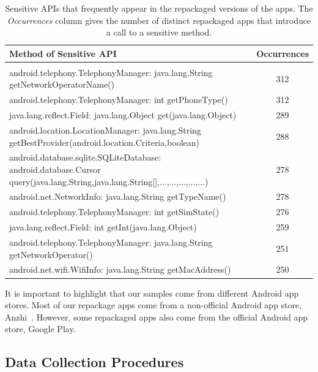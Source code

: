 \begin{table}[ht]
  \caption{Sensitive APIs that frequently appear in the repackaged versions of the apps. The
    \emph{Occurrences} column gives the number of distinct repackaged apps that introduce a call
  to a sensitive method.}
\centering
  \begin{tabular}{lc}

    \hline
    Method of Sensitive API & Occurrences \\
    \hline \\
    android.telephony.TelephonyManager: java.lang.String getNetworkOperatorName() &  312\\
    android.telephony.TelephonyManager: int getPhoneType() &  312 \\
    java.lang.reflect.Field: java.lang.Object get(java.lang.Object) &  289 \\
    android.location.LocationManager: java.lang.String getBestProvider(android.location.Criteria,boolean) &  288 \\
    android.database.sqlite.SQLiteDatabase: android.database.Cursor query(java.lang.String,java.lang.String[],...,...,...,...,...) &  278 \\
    android.net.NetworkInfo: java.lang.String getTypeName() &  278\\
    android.telephony.TelephonyManager: int getSimState() &	276\\
    java.lang.reflect.Field: int getInt(java.lang.Object) &  259\\
    
    android.telephony.TelephonyManager: java.lang.String getNetworkOperator() &  251\\
    android.net.wifi.WifiInfo: java.lang.String getMacAddress()	& 250


    
\\\hline
\end{tabular}
\label{tab:APIused}
\end{table}

It is important to highlight that our samples come from different Android app stores. Most of our repackage apps come from a non-official
Android app store, Anzhi~\cite{anzhi}. However, some repackaged apps also come from the official Android app store, Google Play.


\subsection{Data Collection Procedures} \label{sec:dataCollectionProc}

